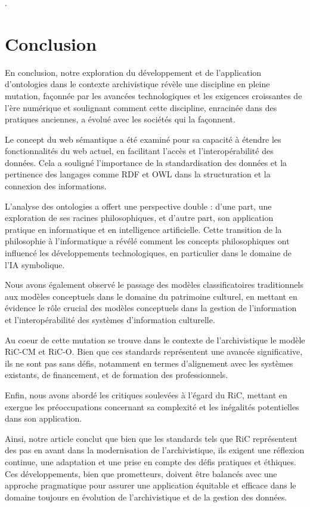 \documentclass[12pt]{report}
\begin{document}
.
\chapter{Conclusion}
En conclusion, notre exploration du développement et de l'application d'ontologies dans le contexte archivistique révèle une discipline en pleine mutation, façonnée par les avancées technologiques et les exigences croissantes de l'ère numérique et soulignant comment cette discipline, enracinée dans des pratiques anciennes, a évolué avec les sociétés qui la façonnent. 

Le concept du web sémantique a été examiné pour sa capacité à étendre les fonctionnalités du web actuel, en facilitant l'accès et l'interopérabilité des données. Cela a souligné l'importance de la standardisation des données et la pertinence des langages comme RDF et OWL dans la structuration et la connexion des informations.

L'analyse des ontologies a offert une perspective double : d'une part, une exploration de ses racines philosophiques, et d'autre part, son application pratique en informatique et en intelligence artificielle. Cette transition de la philosophie à l'informatique a révélé comment les concepts philosophiques ont influencé les développements technologiques, en particulier dans le domaine de l'IA symbolique.

Nous avons également observé le passage des modèles classificatoires traditionnels aux modèles conceptuels dans le domaine du patrimoine culturel, en mettant en évidence le rôle crucial des modèles conceptuels dans la gestion de l'information et l'interopérabilité des systèmes d'information culturelle.

Au coeur de cette mutation se trouve dans le contexte de l'archivistique le modèle RiC-CM et RiC-O. Bien que ces standards représentent une avancée significative, ils ne sont pas sans défis, notamment en termes d'alignement avec les systèmes existants, de financement, et de formation des professionnels.

Enfin, nous avons abordé les critiques soulevées à l'égard du RiC, mettant en exergue les préoccupations concernant sa complexité et les inégalités potentielles dans son application.

Ainsi, notre article conclut que bien que les standards tels que RiC représentent des pas en avant dans la modernisation de l'archivistique, ils exigent une réflexion continue, une adaptation et une prise en compte des défis pratiques et éthiques. Ces développements, bien que prometteurs, doivent être balancés avec une approche pragmatique pour assurer une application équitable et efficace dans le domaine toujours en évolution de l'archivistique et de la gestion des données.

\printbibliography
\end{document}
